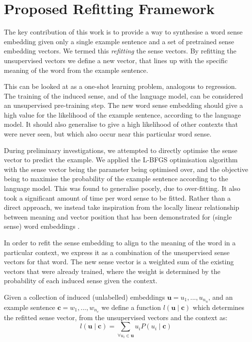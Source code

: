 \documentclass{llncs}
\def\parencite{\cite}
\renewcommand{\c}{\mathbf{c}}
\renewcommand{\u}{\mathbf{u}}
\begin{document}
\section{Proposed Refitting Framework} \label{refitting} \label{Framework}

The key contribution of this work is to provide a way to synthesise a word sense embedding given only a single example sentence and a set of pretrained sense embedding vectors. 
We termed this \emph{refitting} the sense vectors.
By refitting the unsupervised vectors we define a new vector, that lines up with the specific meaning of the word from the example sentence.

This can be looked at as a one-shot learning problem, analogous to regression.
The training of the induced sense, and of the language model, can be considered an unsupervised pre-training step.
The new word sense embedding should give a high value for the likelihood of the example sentence, according to the language model.
It should also generalise to give a high likelihood of other contexts that were never seen, but which also occur near this particular word sense.

During preliminary investigations, we attempted to directly optimise the sense vector to predict the example.
We applied the L-BFGS \parencite{nocedal1980updating} optimisation algorithm with the sense vector being the parameter being optimised over, and the objective being to maximise the probability of the example sentence according to the language model.
This was found to generalise poorly, due to over-fitting.
It also took a significant amount of time per word sense to be fitted.
Rather than a direct approach, we instead take inspiration from the locally linear relationship between meaning and vector position that has been demonstrated for (single sense) word embeddings \parencite{mikolov2013efficient,mikolovSkip,mikolov2013linguisticsubstructures}.

In order to refit the sense embedding to align to the meaning of the word in a particular context, we express it as a combination of the unsupervised sense vectors for that word.
The new sense vector is a weighted sum of the existing vectors that were already trained, where the weight is determined by the probability of each induced sense given the context.


Given a collection of induced (unlabelled) embeddings $\u={u_1,...,u_{n_u}}$, and an example sentence $\c={w_1,...,w_{n_c}}$ we define a function $l(\u \mid \c )$ which determines the refitted sense vector, from the unsupervised vectors and the context as:
\begin{equation} \label{eq:synth}
l(\u \mid \c ) = \sum_{\forall u_i \in \u} u_i P(u_i \mid \c)
\end{equation}
\end{document}
